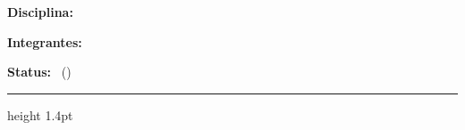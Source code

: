 \documentclass[10pt,a4paper]{article}
\begin{document}
\thispagestyle{fancy}
\frenchspacing

{\LARGE\bfseries\color{TextDark}\docTitulo\par}
\vspace{4pt}
{\small
\textbf{Disciplina:} \docDisciplina\par
\vspace{1pt}
\textbf{Integrantes:} \docIntegrantes\par
\vspace{1pt}
\textbf{Status:} \docStatus\ (\docInstituicao)\par
}
\vspace{4pt}
{\color{PrimaryBlue}\hrule height 1.4pt}
\vspace{2pt}










\begingroup
\nocite{*}
\renewcommand{\refname}{\normalsize Referências}
\let\oldthebibliography\thebibliography
\renewcommand{\thebibliography}[1]{%
  \oldthebibliography{#1}%
  \setlength{\itemsep}{1pt}%
  \setlength{\parskip}{0pt}%
}
\footnotesize


\endgroup
\end{document}
